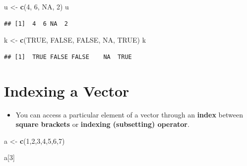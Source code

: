 \documentclass[]{book}
\newenvironment{Shaded}{\begin{snugshade}}{\end{snugshade}}
\newcommand{\KeywordTok}[1]{\textcolor[rgb]{0.13,0.29,0.53}{\textbf{{#1}}}}
\newcommand{\DecValTok}[1]{\textcolor[rgb]{0.00,0.00,0.81}{{#1}}}
\newcommand{\StringTok}[1]{\textcolor[rgb]{0.31,0.60,0.02}{{#1}}}
\newcommand{\OtherTok}[1]{\textcolor[rgb]{0.56,0.35,0.01}{{#1}}}
\newcommand{\NormalTok}[1]{{#1}}
\providecommand{\tightlist}{%
  \setlength{\itemsep}{0pt}\setlength{\parskip}{0pt}}
\begin{document}
\begin{Shaded}
\begin{Highlighting}[]
\NormalTok{u <-}\StringTok{ }\KeywordTok{c}\NormalTok{(}\DecValTok{4}\NormalTok{, }\DecValTok{6}\NormalTok{, }\OtherTok{NA}\NormalTok{, }\DecValTok{2}\NormalTok{)}
\NormalTok{u}
\end{Highlighting}
\end{Shaded}

\begin{verbatim}
## [1]  4  6 NA  2
\end{verbatim}

\begin{Shaded}
\begin{Highlighting}[]
\NormalTok{k <-}\StringTok{ }\KeywordTok{c}\NormalTok{(}\OtherTok{TRUE}\NormalTok{, }\OtherTok{FALSE}\NormalTok{, }\OtherTok{FALSE}\NormalTok{, }\OtherTok{NA}\NormalTok{, }\OtherTok{TRUE}\NormalTok{)}
\NormalTok{k}
\end{Highlighting}
\end{Shaded}

\begin{verbatim}
## [1]  TRUE FALSE FALSE    NA  TRUE
\end{verbatim}

\section{Indexing a Vector}\label{indexing-a-vector}

\begin{itemize}
\tightlist
\item
  You can access a particular element of a vector through an
  \textbf{index} between \textbf{square brackets} or \textbf{indexing
  (subsetting) operator}.
\end{itemize}

\begin{Shaded}
\begin{Highlighting}[]
\NormalTok{a <-}\StringTok{ }\KeywordTok{c}\NormalTok{(}\DecValTok{1}\NormalTok{,}\DecValTok{2}\NormalTok{,}\DecValTok{3}\NormalTok{,}\DecValTok{4}\NormalTok{,}\DecValTok{5}\NormalTok{,}\DecValTok{6}\NormalTok{,}\DecValTok{7}\NormalTok{)}
\end{Highlighting}
\end{Shaded}

\begin{Shaded}
\begin{Highlighting}[]
\NormalTok{a[}\DecValTok{3}\NormalTok{]}
\end{Highlighting}
\end{Shaded}
\end{document}
